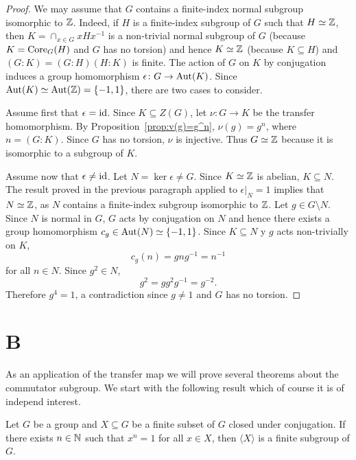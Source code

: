 \begin{proof}
	We may assume that $G$ contains a finite-index normal subgroup isomorphic to $\mathbb{Z}$. Indeed, 
	if $H$ is a finite-index subgroup of $G$ such that $H\simeq\mathbb{Z}$, then 
	$K=\cap_{x\in G}xHx^{-1}$ is a non-trivial normal subgroup of $G$ (because $K=\operatorname{Core}_G(H)$ and 
	$G$ has no torsion) and hence $K\simeq\mathbb{Z}$ (because  
	$K\subseteq H$) and $(G:K)=(G:H)(H:K)$ is finite.
	The action of $G$ on $K$ by conjugation induces a group homomorphism  
	$\epsilon\colon G\to\operatorname{Aut}(K)$. Since $\operatorname{Aut}(K)\simeq\operatorname{Aut}(\mathbb{Z})=\{-1,1\}$, 
	there are two cases to consider.
	
	Assume first that $\epsilon=\operatorname{id}$. Since $K\subseteq Z(G)$, let
	$\nu\colon G\to K$ be the transfer homomorphism. By
	Proposition~\ref{prop:v(g)=g^n}, $\nu(g)=g^n$, where $n=(G:K)$. Since
	$G$ has no torsion, $\nu$ is injective. Thus
	$G\simeq\mathbb{Z}$ because it is isomorphic to a subgroup of $K$.

	Assume now that $\epsilon\ne\operatorname{id}$. Let $N=\ker\epsilon\ne G$. Since
	$K\simeq\mathbb{Z}$ is abelian, $K\subseteq N$. The result proved in the previous paragraph 
	applied to $\epsilon|_N=1$ implies that $N\simeq\mathbb{Z}$, as 
	$N$ contains a finite-index subgroup isomorphic to $\mathbb{Z}$. Let $g\in G\setminus N$. 
	Since $N$ is normal in $G$, $G$ acts by conjugation on $N$ and hence 
	there exists a group homomorphism $c_g\in\operatorname{Aut}(N)\simeq\{-1,1\}$. Since
	$K\subseteq N$ y $g$ acts non-trivially on $K$, 
	\[
	c_g(n)=gng^{-1}=n^{-1}
	\]
	for all $n\in N$.  Since 
	$g^2\in N$, 
	\[
		g^2=gg^2g^{-1}=g^{-2}.
	\]
	Therefore $g^4=1$, a contradiction since $g\ne1$ and $G$ has no torsion.
\end{proof}


\section*{B}

As an application of the transfer map we will prove several theorems
about the commutator subgroup. We start
with the following result which of course it is of independ interest. 

\begin{theorem}[Dietzmann]
	\label{theorem:Dietzmann} 
	Let $G$ be a group and $X\subseteq G$ be a finite subset of 
	$G$ closed under conjugation. If there exists $n\in\mathbb{N}$ such that 
	$x^n=1$ for all $x\in X$, then $\langle X\rangle$ is a finite subgroup of 
	$G$.
\end{theorem}

